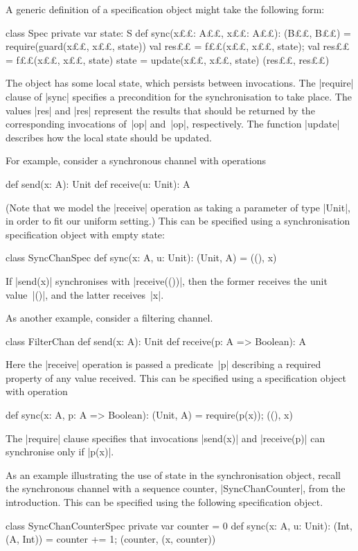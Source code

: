 A generic definition of a specification object might take the following form: 
%
\begin{scala}
class Spec{
  private var state: S
  def sync(x££: A££, x££: A££): (B££, B££) = {
    require(guard(x££, x££, state))
    val res££ = f££(x££, x££, state); val res££ = f££(x££, x££, state)
    state = update(x££, x££, state)
    (res££, res££)
  }
}
\end{scala}
%
The object has some local state, which persists between invocations.  The
|require| clause of |sync| specifies a precondition for the synchronisation to
take place.  The values |res| and |res| represent the results that
should be returned by the corresponding invocations of~|op| and~|op|,
respectively.  The function |update| describes how the local state should be
updated. 

For example, consider a synchronous channel with operations
\begin{scala}
  def send(x: A): Unit
  def receive(u: Unit): A
\end{scala}
%
(Note that we model the |receive| operation as taking a parameter of type
|Unit|, in order to fit our uniform setting.) 
%
This can be specified using a synchronisation specification object
with empty state:
%
\begin{scala}
class SyncChanSpec{
  def sync(x: A, u: Unit): (Unit, A) = ((), x)
}
\end{scala}
%
If |send(x)| synchronises with |receive(())|, then the former receives the
unit value~|()|, and the latter receives~|x|. 

As another example, consider a filtering channel.
\begin{scala}
class FilterChan{
  def send(x: A): Unit
  def receive(p: A => Boolean): A
}
\end{scala}
%
Here the |receive| operation is passed a predicate~|p| describing a required
property of any value received.  This can be specified using a specification
object with operation
%
\begin{scala}
  def sync(x: A, p: A => Boolean): (Unit, A) = { require(p(x)); ((), x) }
\end{scala}
%
The |require| clause specifies that invocations |send(x)| and |receive(p)| can
synchronise only if |p(x)|.

As an example illustrating the use of state in the synchronisation object,
recall the synchronous channel with a sequence counter, |SyncChanCounter|,
from the introduction.  This can be specified using the following
specification object.
%
\begin{scala}
class SyncChanCounterSpec{
  private var counter = 0
  def sync(x: A, u: Unit): (Int, (A, Int)) = {
    counter += 1; (counter, (x, counter))
  }
}
\end{scala}

